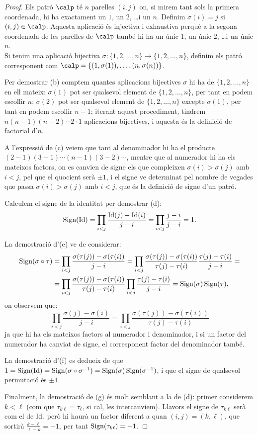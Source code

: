 \begin{proof}
    Els patró $\calp$ té $n$ parelles $(i,j)$ on, si mirem tant sols la primera coordenada, hi ha exactament un $1$, un $2$, \ldots i un $n$. Definim $\sigma(i)=j$ si $(i,j)\in\calp$. Aquesta aplicació és injectiva i exhaustiva perquè a la segona coordenada de les parelles de $\calp$ també hi ha un únic $1$, un únic $2$, \ldots i un únic $n$.\\
    Si tenim una aplicació bijectiva $\sigma\colon \{1,2,\dots,n\} \to \{1,2,\dots,n\}$, definim els patró corresponent com $\calp=\{(1,\sigma(1)), \ldots, (n,\sigma(n))\}$.
    
    Per demostrar (b) comptem quantes aplicacions bijectives $\sigma$ hi ha de $\{1,2,\dots, n\}$ en ell mateix: $\sigma(1)$ pot ser qualsevol element de $\{1,2,\dots, n\}$, per tant en podem escollir $n$; 
    $\sigma(2)$ pot ser qualsevol element de $\{1,2,\dots, n\}$ excepte $\sigma(1)$, per tant en podem escollir $n-1$;
    iterant aquest procediment, tindrem $n(n-1)(n-2) \cdots 2\cdot 1$ aplicacions bijectives, i aquesta és la definició de factorial d'$n$.
    
    A l'expressió de (c) veiem que tant al denominador hi ha el producte $(2-1)(3-1)\cdots (n-1)(3-2) \cdots$, mentre que al numerador hi ha els mateixos factors, on es canvien de signe els que compleixen $\sigma(i)>\sigma(j)$ amb $i<j$, pel que el quocient serà $\pm 1$, i el signe ve determinat pel nombre de vegades que passa $\sigma(i)>\sigma(j)$ amb $i<j$, que és la definició de signe d'un patró.
    
    Calculem el signe de la identitat per demostrar (d):
    $$
    \operatorname{Sign}(\operatorname{Id})=\prod_{i<j} \frac{\operatorname{Id}(j)-\operatorname{Id}(i)}{j-i}=\prod_{i<j} \frac{j-i}{j-i}=1 .
    $$
    
    La demostració d'(e) ve de considerar:
    \begin{align*}
    \operatorname{Sign}(\sigma\circ\tau) & =\prod_{i<j} \frac{\sigma(\tau(j))-\sigma(\tau(i))}{j-i}  =
    \prod_{i<j} \frac{\sigma(\tau(j))-\sigma(\tau(i))}{\tau(j)-\tau(i)}\frac{\tau(j)-\tau(i)}{j-i}=\\
     & =\prod_{i<j} \frac{\sigma(\tau(j))-\sigma(\tau(i))}{\tau(j)-\tau(i)}\prod_{i<j}\frac{\tau(j)-\tau(i)}{j-i}= \operatorname{Sign}(\sigma)\operatorname{Sign}(\tau),
    \end{align*}
    on observem que:
    $$
    \prod_{i<j}\frac{\sigma(j)-\sigma(i)}{j-i}=\prod_{i<j} \frac{\sigma(\tau(j))-\sigma(\tau(i))}{\tau(j)-\tau(i)}
    $$
    ja que hi ha els mateixos factors al numerador i denominador, i si un factor del numerador ha canviat de signe, el corresponent factor del denominador també.
    
    La demostració d'(f) es dedueix de que $1=\operatorname{Sign}(\operatorname{Id})=\operatorname{Sign}(\sigma\circ \sigma^{-1})=\operatorname{Sign}(\sigma)\operatorname{Sign}(\sigma^{-1})$, i que el signe de qualsevol permutació és $\pm1$.

    Finalment, la demostració de (g) és molt semblant a la de (d): primer considerem $k<\ell$ (com que $\tau_{k\ell}=\tau_{\ell}$, si cal, les intercanviem). Llavors el signe de $\tau_{k\ell}$ serà com el de $\operatorname{Id}$, però hi haurà un factor diferent a quan $(i,j)=(k,\ell)$, que sortirà $\frac{k-\ell}{\ell-k}=-1$, per tant $\operatorname{Sign}(\tau_{k\ell})=-1$. 
\end{proof}

